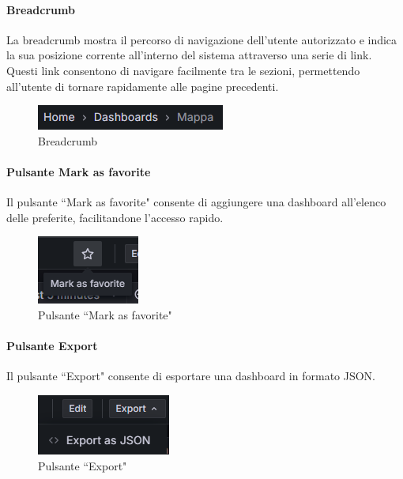 \documentclass[10pt]{article}
\begin{document}
\begin{justify}
    \paragraph{Breadcrumb}
    La breadcrumb mostra il percorso di navigazione dell'utente autorizzato e indica la sua posizione corrente all'interno del sistema attraverso una serie di link. Questi link consentono di navigare facilmente tra le sezioni, permettendo all'utente di tornare rapidamente alle pagine precedenti.
    \begin{figure}[H]
    \centering
    \includegraphics[width=0.35\linewidth]{breadcrumb.png}
    \caption{Breadcrumb}
    \end{figure}

    \paragraph{Pulsante Mark as favorite}
    Il pulsante ``Mark as favorite" consente di aggiungere una dashboard all'elenco delle preferite, facilitandone l'accesso rapido.
    \begin{figure}[H]
    \centering
    \includegraphics[width=0.18\linewidth]{favorite.png}
    \caption{Pulsante ``Mark as favorite"}
    \end{figure}

    \paragraph{Pulsante Export}
    Il pulsante ``Export" consente di esportare una dashboard in formato JSON.
    \begin{figure}[H]
    \centering
    \includegraphics[width=0.2\linewidth]{export.png}
    \caption{Pulsante ``Export"}
    \end{figure}


\end{justify}
\end{document}
